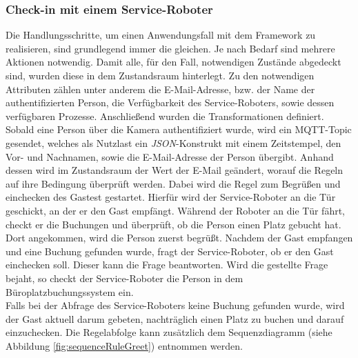     \subsubsection*{Check-in mit einem Service-Roboter}
        Die Handlungsschritte, um einen Anwendungsfall mit dem Framework zu realisieren, sind grundlegend immer die gleichen. Je nach Bedarf sind mehrere 
        Aktionen notwendig. Damit alle, für den Fall, notwendigen Zustände abgedeckt sind, wurden diese in dem Zustandsraum hinterlegt. Zu den notwendigen Attributen 
        zählen unter anderem die E-Mail-Adresse, bzw. der Name der authentifizierten Person, die Verfügbarkeit des Service-Roboters, sowie dessen 
        verfügbaren Prozesse. Anschließend wurden die Transformationen definiert. 
        \\
        \linebreak
        Sobald eine Person über die Kamera authentifiziert wurde, wird ein \acs{MQTT}-Topic gesendet, welches als Nutzlast ein \textit{JSON}-Konstrukt mit einem Zeitstempel, den 
        Vor- und Nachnamen, sowie die E-Mail-Adresse der Person übergibt. Anhand dessen wird im Zustandsraum der Wert der E-Mail geändert, worauf die Regeln auf ihre 
        Bedingung überprüft werden. Dabei wird die Regel zum Begrüßen und einchecken des Gastest gestartet. Hierfür wird der Service-Roboter an die Tür geschickt, an der er den 
        Gast empfängt. Während der Roboter an die Tür fährt, checkt er die Buchungen und überprüft, ob die Person einen Platz gebucht hat. Dort angekommen, wird die Person zuerst 
        begrüßt. Nachdem der Gast empfangen und eine Buchung gefunden wurde, fragt der Service-Roboter, ob er den Gast einchecken soll. Dieser kann die Frage beantworten. 
        Wird die gestellte Frage bejaht, so checkt der Service-Roboter die Person in dem Büroplatzbuchungssystem ein.  
        \\ 
        Falls bei der Abfrage des Service-Roboters keine Buchung gefunden wurde, wird der Gast aktuell darum gebeten, nachträglich einen Platz zu buchen und darauf einzuchecken. 
        Die Regelabfolge kann zusätzlich dem Sequenzdiagramm (siehe Abbildung \ref{fig:sequenceRuleGreet}) entnommen werden.
